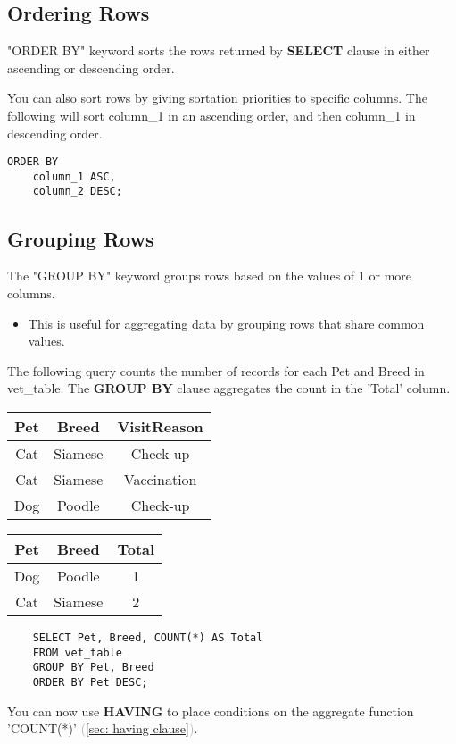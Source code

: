 
\subsection{Ordering Rows}
"ORDER BY" keyword sorts the rows returned by \textcolor{textgray}{\textbf{SELECT}} clause in either ascending or descending order.


You can also sort rows by giving sortation priorities to specific columns. The following will sort column\_1 in an ascending order, and then column\_1 in descending order.

\begin{verbatim}
ORDER BY 
    column_1 ASC, 
    column_2 DESC;
\end{verbatim}

\subsection{Grouping Rows}
\label{sec: group by}
The "GROUP BY" keyword groups rows based on the values of 1 or more columns.
\begin{itemize}
    \item This is useful for aggregating data by grouping rows that share common values.
\end{itemize}

The following query counts the number of records for each Pet and Breed in vet\_table. The \textcolor{textgray}{\textbf{GROUP BY}} clause aggregates the count in the 'Total' column. 
\begin{center}
\begin{minipage}{0.45\textwidth}
    \centering
    \begin{tabular}{c|c|c}
     Pet&Breed&VisitReason  \\
     \hline
     Cat&Siamese& Check-up\\
     Cat&Siamese& Vaccination\\
     Dog & Poodle & Check-up
    \end{tabular}
\end{minipage}
\hspace{0.05\textwidth} %
\begin{minipage}{0.45\textwidth}
    \centering
    \begin{tabular}{|c|c|c|}
    \hline
    Pet & Breed & Total \\
    \hline
    Dog & Poodle & 1 \\
    Cat & Siamese & 2 \\
    \hline
    \end{tabular}
\end{minipage}
\end{center}
\begin{verbatim}
    SELECT Pet, Breed, COUNT(*) AS Total
    FROM vet_table
    GROUP BY Pet, Breed
    ORDER BY Pet DESC;
\end{verbatim}
You can now use \textcolor{textgray}{\textbf{HAVING}} to place conditions on the aggregate function 'COUNT(*)' \textcolor{darkgray}{(\ref{sec: having clause})}.